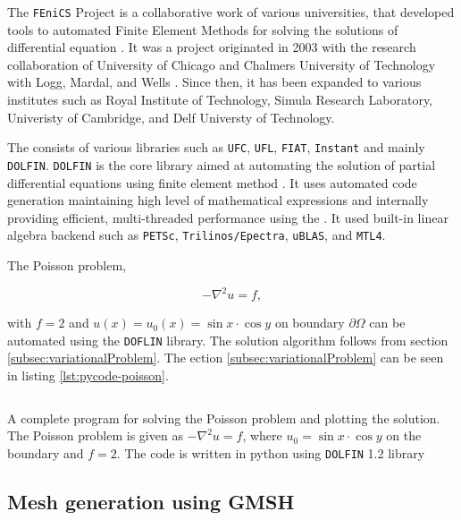 The \texttt{FEniCS} Project is a collaborative work of various universities, that developed tools to automated Finite Element Methods for solving the solutions of differential equation \cite{FenicsAbout}. It was a project originated in 2003 with the research collaboration of University of Chicago and Chalmers University of Technology with Logg,  Mardal, and Wells \cite{Logg2012a}. Since then, it has been expanded to various institutes such as Royal Institute of Technology, Simula Research Laboratory, Univeristy of Cambridge, and Delf Universty of Technology.

The consists of various libraries such as \texttt{UFC}, \texttt{UFL}, \texttt{FIAT}, \texttt{Instant} and mainly \texttt{DOLFIN}. \texttt{DOLFIN} is the core library aimed at automating the solution of partial differential equations using finite element method \cite{Logg2011}. It uses automated code generation maintaining high level of mathematical expressions and internally providing efficient, multi-threaded performance using the . It used built-in linear algebra backend such as \texttt{PETSc}, \texttt{Trilinos/Epectra}, \texttt{uBLAS}, and \texttt{MTL4}.

The Poisson problem,

	\begin{equation}
	-\nabla^2 u = f,
	\end{equation}

with $f=2$ and $u(x) = u_0(x) = \sin x \cdot \cos y$ on boundary $\partial \Omega$ can be automated using the \texttt{DOFLIN} library. The solution algorithm follows from section \ref{subsec:variationalProblem}. The ection \ref{subsec:variationalProblem} can be seen in listing \ref{lst:pycode-poisson}.

	\begin{listing}[p]
	\inputminted[fontseries=courier,obeytabs,fontsize=\footnotesize,mathescape,linenos,numbersep=5pt,frame=lines,framesep=2mm,xleftmargin=20mm,xrightmargin=20mm]{python}{figures/eulerian/dolfinExample.py}
	\caption{A complete program for solving the Poisson problem and plotting the solution. The Poisson problem is given as $-\nabla^2{u} = f$, where $u_0 = \sin{x}\cdot\cos{y}$ on the boundary and $f=2$. The code is written in python using \texttt{DOLFIN} 1.2 library}
	\label{lst:pycode-poisson}
	\end{listing}
	

\subsection{Mesh generation using GMSH}


